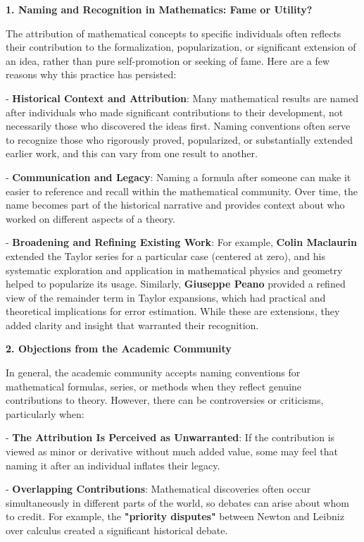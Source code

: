 \documentclass[a4paper,12pt]{book}
\begin{document}
\textbf{1. Naming and Recognition in Mathematics: Fame or Utility?}

The attribution of mathematical concepts to specific individuals often reflects their contribution to the formalization, popularization, or significant extension of an idea, rather than pure self-promotion or seeking of fame. Here are a few reasons why this practice has persisted:

- \textbf{Historical Context and Attribution}: Many mathematical results are named after individuals who made significant contributions to their development, not necessarily those who discovered the ideas first. Naming conventions often serve to recognize those who rigorously proved, popularized, or substantially extended earlier work, and this can vary from one result to another.

- \textbf{Communication and Legacy}: Naming a formula after someone can make it easier to reference and recall within the mathematical community. Over time, the name becomes part of the historical narrative and provides context about who worked on different aspects of a theory.

- \textbf{Broadening and Refining Existing Work}: For example, \textbf{Colin Maclaurin} extended the Taylor series for a particular case (centered at zero), and his systematic exploration and application in mathematical physics and geometry helped to popularize its usage. Similarly, \textbf{Giuseppe Peano} provided a refined view of the remainder term in Taylor expansions, which had practical and theoretical implications for error estimation. While these are extensions, they added clarity and insight that warranted their recognition.

\textbf{2. Objections from the Academic Community}

In general, the academic community accepts naming conventions for mathematical formulas, series, or methods when they reflect genuine contributions to theory. However, there can be controversies or criticisms, particularly when:

- \textbf{The Attribution Is Perceived as Unwarranted}: If the contribution is viewed as minor or derivative without much added value, some may feel that naming it after an individual inflates their legacy.

- \textbf{Overlapping Contributions}: Mathematical discoveries often occur simultaneously in different parts of the world, so debates can arise about whom to credit. For example, the \textbf{"priority disputes"} between Newton and Leibniz over calculus created a significant historical debate.
\end{document}
